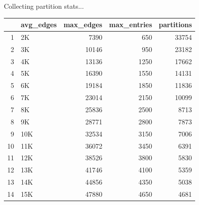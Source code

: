 \documentclass{beamer}
\begin{document}
\begin{frame}{Collecting partition stats...}
    \centering 
    \begin{table}[ht]
    \centering
    \begin{tabular}{rlrrr}
    \hline
    & avg\_edges & max\_edges & max\_entries & partitions \\ 
    \hline
    1 & 2K & 7390       & 650   & 33754 \\ 
    2 & 3K & 10146     & 950   & 23182 \\ 
    3 & 4K & 13136     & 1250 & 17662 \\ 
    4 & 5K & 16390     & 1550 & 14131 \\ 
    5 & 6K & 19184     & 1850 & 11836 \\ 
    6 & 7K & 23014     & 2150 & 10099 \\ 
    7 & 8K & 25836     & 2500 & 8713 \\ 
    8 & 9K & 28771     & 2800 & 7873 \\ 
    9 & 10K & 32534   & 3150 & 7006 \\ 
    10 & 11K & 36072 & 3450 & 6391 \\ 
    11 & 12K & 38526 & 3800 & 5830 \\ 
    12 & 13K & 41746 & 4100 & 5359 \\ 
    13 & 14K & 44856 & 4350 & 5038 \\ 
    14 & 15K & 47880 & 4650 & 4681 \\ 
    \hline
    \end{tabular}
    \end{table}    
\end{frame}
\end{document}
